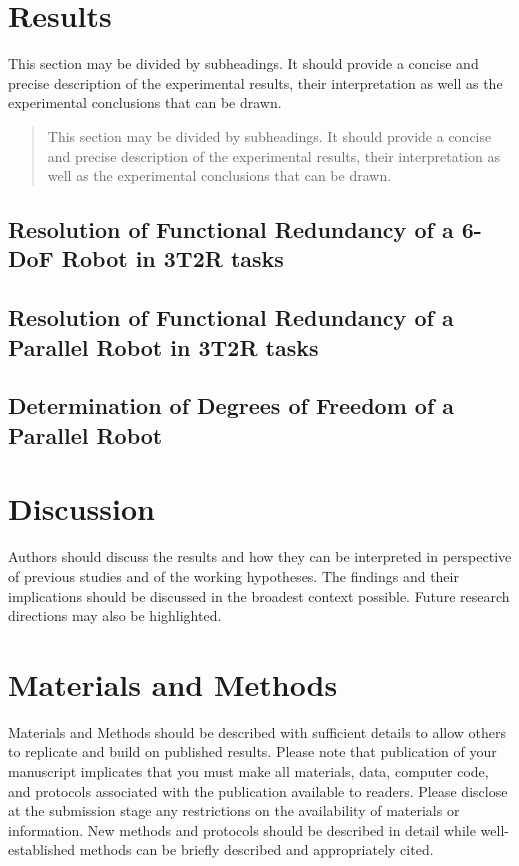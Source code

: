 \documentclass[robotics,article,submit,moreauthors,pdftex]{Definitions/mdpi}
\begin{document}
\section{Results}
\label{sec:Ergebnisse}

This section may be divided by subheadings. It should provide a concise and precise description of the experimental results, their interpretation as well as the experimental conclusions that can be drawn.
\begin{quote}
This section may be divided by subheadings. It should provide a concise and precise description of the experimental results, their interpretation as well as the experimental conclusions that can be drawn.
\end{quote}

\subsection{Resolution of Functional Redundancy of a 6-DoF Robot in 3T2R tasks}


\subsection{Resolution of Functional Redundancy of a Parallel Robot in 3T2R tasks}

\subsection{Determination of Degrees of Freedom of a Parallel Robot}

\section{Discussion}

Authors should discuss the results and how they can be interpreted in perspective of previous studies and of the working hypotheses. The findings and their implications should be discussed in the broadest context possible. Future research directions may also be highlighted.

\section{Materials and Methods}

Materials and Methods should be described with sufficient details to allow others to replicate and build on published results. Please note that publication of your manuscript implicates that you must make all materials, data, computer code, and protocols associated with the publication available to readers. Please disclose at the submission stage any restrictions on the availability of materials or information. New methods and protocols should be described in detail while well-established methods can be briefly described and appropriately cited.
\end{document}
